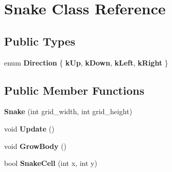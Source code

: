 \hypertarget{classSnake}{}\section{Snake Class Reference}
\label{classSnake}
\subsection*{Public Types}
\begin{DoxyCompactItemize}
\item 
enum {\bfseries Direction} \{ {\bfseries k\+Up}, 
{\bfseries k\+Down}, 
{\bfseries k\+Left}, 
{\bfseries k\+Right}
 \}\hypertarget{classSnake_a17196bbf1b4636022495ef12635a68f7}{}\label{classSnake_a17196bbf1b4636022495ef12635a68f7}

\end{DoxyCompactItemize}
\subsection*{Public Member Functions}
\begin{DoxyCompactItemize}
\item 
{\bfseries Snake} (int grid\+\_\+width, int grid\+\_\+height)\hypertarget{classSnake_aa1f5dfbec9fde99f85144c71f1de4964}{}\label{classSnake_aa1f5dfbec9fde99f85144c71f1de4964}

\item 
void {\bfseries Update} ()\hypertarget{classSnake_a0df29710321124322656444348407aec}{}\label{classSnake_a0df29710321124322656444348407aec}

\item 
void {\bfseries Grow\+Body} ()\hypertarget{classSnake_a670232685308159dc43bdcfff8d0eba6}{}\label{classSnake_a670232685308159dc43bdcfff8d0eba6}

\item 
bool {\bfseries Snake\+Cell} (int x, int y)\hypertarget{classSnake_ac56395b863bb1155b15c43a97458be3f}{}\label{classSnake_ac56395b863bb1155b15c43a97458be3f}

\end{DoxyCompactItemize}
